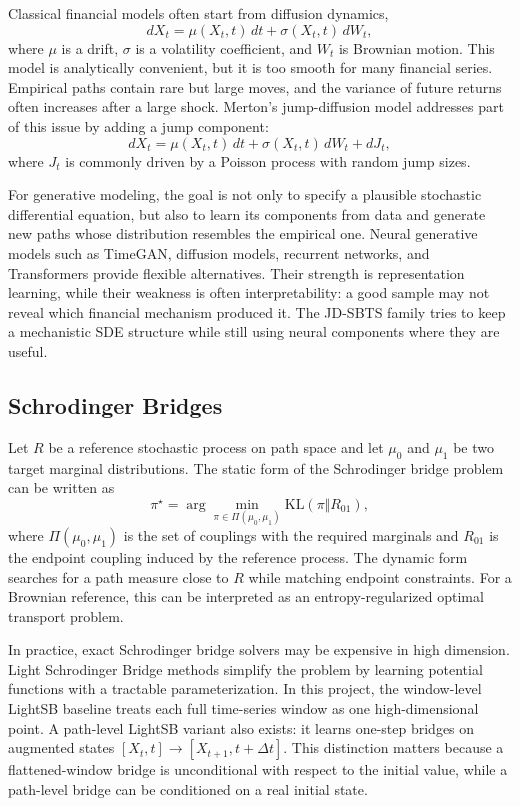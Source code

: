 \documentclass[11pt,a4paper]{article}
\begin{document}
Classical financial models often start from diffusion dynamics,
\begin{equation}
    dX_t = \mu(X_t,t)\,dt + \sigma(X_t,t)\,dW_t,
\end{equation}
where $\mu$ is a drift, $\sigma$ is a volatility coefficient, and $W_t$ is
Brownian motion. This model is analytically convenient, but it is too smooth for
many financial series. Empirical paths contain rare but large moves, and the
variance of future returns often increases after a large shock. Merton's
jump-diffusion model addresses part of this issue by adding a jump component:
\begin{equation}
    dX_t = \mu(X_t,t)\,dt + \sigma(X_t,t)\,dW_t + dJ_t,
\end{equation}
where $J_t$ is commonly driven by a Poisson process with random jump sizes.

For generative modeling, the goal is not only to specify a plausible stochastic
differential equation, but also to learn its components from data and generate
new paths whose distribution resembles the empirical one. Neural generative
models such as TimeGAN, diffusion models, recurrent networks, and Transformers
provide flexible alternatives. Their strength is representation learning, while
their weakness is often interpretability: a good sample may not reveal which
financial mechanism produced it. The JD-SBTS family tries to keep a mechanistic
SDE structure while still using neural components where they are useful.

\subsection{Schrodinger Bridges}

Let $R$ be a reference stochastic process on path space and let $\mu_0$ and
\(\mu_1\) be two target marginal distributions. The static form of the
Schrodinger bridge problem can be written as
\begin{equation}
    \pi^\star
    =
    \arg\min_{\pi \in \Pi(\mu_0,\mu_1)}
    \mathrm{KL}(\pi \Vert R_{01}),
\end{equation}
where $\Pi(\mu_0,\mu_1)$ is the set of couplings with the required marginals
and $R_{01}$ is the endpoint coupling induced by the reference process. The
dynamic form searches for a path measure close to $R$ while matching endpoint
constraints. For a Brownian reference, this can be interpreted as an
entropy-regularized optimal transport problem.

In practice, exact Schrodinger bridge solvers may be expensive in high
dimension. Light Schrodinger Bridge methods simplify the problem by learning
potential functions with a tractable parameterization. In this project, the
window-level LightSB baseline treats each full time-series window as one
high-dimensional point. A path-level LightSB variant also exists: it learns
one-step bridges on augmented states $[X_t,t]\rightarrow[X_{t+1},t+\Delta t]$.
This distinction matters because a flattened-window bridge is unconditional
with respect to the initial value, while a path-level bridge can be conditioned
on a real initial state.
\end{document}
